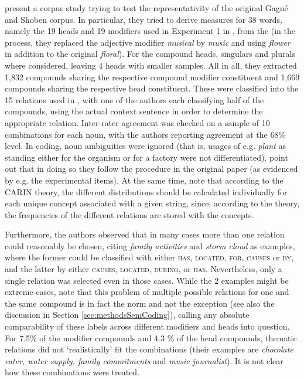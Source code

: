 \citet{Maguireetal:2007} present a corpus study trying
to test the representativity of the original Gagné and
Shoben corpus. In particular, they tried to derive measures for 38
words, namely the 19
heads and 19 modifiers used in Experiment 1 in
\citet{GagneandShoben:1997}, from the  (in the process, they
replaced the adjective modifier \emph{musical} by \emph{music} and using
\emph{flower} in addition to the original \emph{floral}). 
For the compound heads,
singulars and plurals where considered, leaving 4 heads with smaller
samples. All in all, they extracted 1,832 compounds sharing the
respective compound modifier constituent and 1,669 compounds sharing
the respective head constituent. These were classified into the 15 relations used in
\citet{GagneandShoben:1997}, with one of the authors each classifying
half of the compounds, using the actual  context sentence in order
to determine the appropriate relation. Inter-rater agreement was
checked on a
sample of 10 combinations for each noun, with the authors reporting
agreement at the  68\% level.  
In coding, noun ambiguities were ignored (that is, usages of
e.g. \emph{plant} as standing either for the organism or for a factory
were not differentiated). \citet[813]{Maguireetal:2007} point out that
in doing so they follow the procedure in the original
paper (as evidenced by e.g. the experimental items). At the same time,
\citet[813]{Maguireetal:2007} note that  according to
the CARIN theory, the different distributions should be calculated individually for each
unique concept associated with a given string, since, according to the theory, the frequencies
of the different relations are stored with the concepts.

Furthermore, the authors observed that in many cases more than one
relation could reasonably be chosen, citing \emph{family activities}
and \emph{storm cloud} as examples, where the former could be
classified with either \textsc{has}, \textsc{located}, \textsc{for},
\textsc{causes} or \textsc{by}, and the latter by either \textsc{causes},
\textsc{located}, \textsc{during}, or \textsc{has}. Nevertheless, only
a single relation was selected even in those cases. While the 2
examples might be extreme cases, note that this problem of multiple
possible relations for one and the same compound is in fact the norm
and not the exception (see also the discussion in Section
\ref{sec:methodsSemCoding}), calling any absolute comparability of
these labels across different modifiers and heads into question.  For
7.5\% of the modifier compounds and 4.3 \% of the head compounds,
thematic relations did not `realistically' fit the combinations (their
examples are \emph{chocolate eater, water supply, family commitments} and
  \emph{music journalist}). It is not clear how these combinations were
treated.

